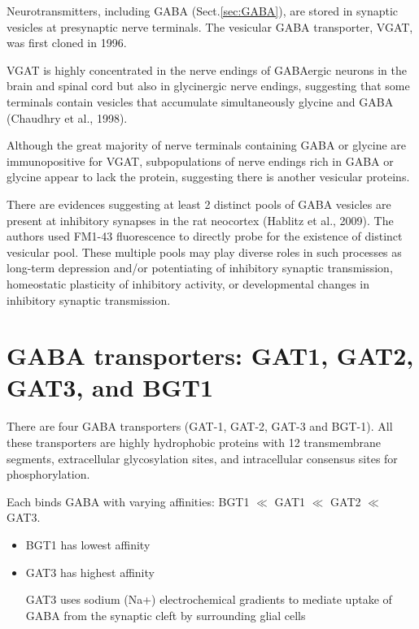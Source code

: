 Neurotransmitters, including GABA (Sect.\ref{sec:GABA}), are stored in synaptic
vesicles at presynaptic nerve terminals. The vesicular GABA transporter, VGAT,
was first cloned in 1996.

VGAT is highly concentrated in the nerve endings of GABAergic neurons in the
brain and spinal cord but also in glycinergic nerve endings, suggesting that
some terminals contain vesicles that accumulate simultaneously glycine and GABA
(Chaudhry et al., 1998).

Although the great majority of nerve terminals containing GABA or glycine are
immunopositive for VGAT, subpopulations of nerve endings rich in GABA or glycine
appear to lack the protein, suggesting there is another vesicular proteins.

There are evidences suggesting at least 2 distinct pools of GABA vesicles are
present at inhibitory synapses in the rat neocortex (Hablitz et al., 2009).
The authors used FM1-43 fluorescence to directly probe for the existence of
distinct vesicular pool.
These multiple pools may play diverse roles in such processes as long-term
depression and/or potentiating of inhibitory synaptic transmission, homeostatic
plasticity of inhibitory activity, or developmental changes in inhibitory
synaptic transmission.


\section{GABA transporters: GAT1, GAT2, GAT3, and BGT1}
\label{sec:GAT-1}
\label{sec:GAT-2}
\label{sec:GAT-3}
\label{sec:BGT-1}

There are four GABA transporters (GAT-1, GAT-2, GAT-3 and BGT-1).
All these transporters are highly hydrophobic proteins with 12 transmembrane
segments, extracellular glycosylation sites, and intracellular consensus sites
for phosphorylation. 



Each binds GABA with varying affinities: BGT1 $\ll$ GAT1 $\ll$ GAT2 $\ll$ GAT3.
\begin{itemize}

  \item BGT1 has lowest affinity

  \item GAT3 has highest affinity
  
 GAT3 uses sodium (Na+) electrochemical gradients to mediate uptake of GABA from
 the synaptic cleft by surrounding glial cells
  
\end{itemize}

